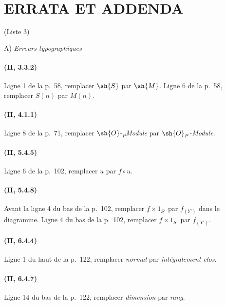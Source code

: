 \clearpage
{}
{}
\section*{ERRATA ET ADDENDA}
\begin{center}\large (Liste 3)\end{center}

\begin{center}
A) \emph{Erreurs typographiques}
\end{center}

\paragraph{(II, 3.3.2)}
Ligne 1 de la p.~58, remplacer $\sh{S}$ par $\sh{M}$. Ligne 6 de la
p.~58, remplacer $S(n)$ par $M(n)$.

\paragraph{(II, 4.1.1)}
Ligne 8 de la p.~71, remplacer $\sh{O}$-${}_P$\emph{Module} par
$\sh{O}_P$-\emph{Module}.

\paragraph{(II, 5.4.5)}
Ligne 6 de la p.~102, remplacer $u$ par $f\circ u$.

\paragraph{(II, 5.4.8)}
Avant la ligne 4 du bas de la p.~102, remplacer $f\times1_{S'}$ par
$f_{(Y')}$ dans le diagramme. Ligne 4 du bas de la p.~102, remplacer
$f\times1_{S'}$ par $f_{(Y')}$.

\paragraph{(II, 6.4.4)}
Ligne 1 du haut de la p.~122, remplacer \emph{normal} par \emph{intégralement clos}.

\paragraph{(II, 6.4.7)}
Ligne 14 du bas de la p.~122, remplacer \emph{dimension} par \emph{rang}.


